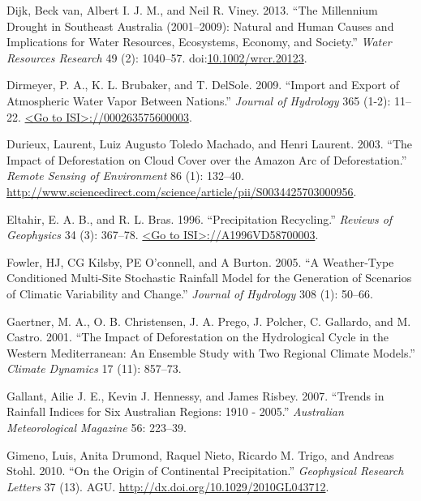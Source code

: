 \documentclass[fleqn,10pt,lineno]{wlpeerj} %
\begin{document}
\hypertarget{ref-vanDijk2013}{}
Dijk, Beck van, Albert I. J. M., and Neil R. Viney. 2013. ``The
Millennium Drought in Southeast Australia (2001--2009): Natural and
Human Causes and Implications for Water Resources, Ecosystems, Economy,
and Society.'' \emph{Water Resources Research} 49 (2): 1040--57.
doi:\href{https://doi.org/10.1002/wrcr.20123}{10.1002/wrcr.20123}.

\hypertarget{ref-Dirmeyer2009}{}
Dirmeyer, P. A., K. L. Brubaker, and T. DelSole. 2009. ``Import and
Export of Atmospheric Water Vapor Between Nations.'' \emph{Journal of
Hydrology} 365 (1-2): 11--22.
\href{\%3CGo\%20to\%20ISI\%3E://000263575600003}{\textless{}Go to ISI\textgreater{}://000263575600003}.

\hypertarget{ref-Durieux2003}{}
Durieux, Laurent, Luiz Augusto Toledo Machado, and Henri Laurent. 2003.
``The Impact of Deforestation on Cloud Cover over the Amazon Arc of
Deforestation.'' \emph{Remote Sensing of Environment} 86 (1): 132--40.
\url{http://www.sciencedirect.com/science/article/pii/S0034425703000956}.

\hypertarget{ref-Eltahir1996}{}
Eltahir, E. A. B., and R. L. Bras. 1996. ``Precipitation Recycling.''
\emph{Reviews of Geophysics} 34 (3): 367--78.
\href{\%3CGo\%20to\%20ISI\%3E://A1996VD58700003}{\textless{}Go to ISI\textgreater{}://A1996VD58700003}.

\hypertarget{ref-Fowler2005}{}
Fowler, HJ, CG Kilsby, PE O'connell, and A Burton. 2005. ``A
Weather-Type Conditioned Multi-Site Stochastic Rainfall Model for the
Generation of Scenarios of Climatic Variability and Change.''
\emph{Journal of Hydrology} 308 (1): 50--66.

\hypertarget{ref-Gaertner2001}{}
Gaertner, M. A., O. B. Christensen, J. A. Prego, J. Polcher, C.
Gallardo, and M. Castro. 2001. ``The Impact of Deforestation on the
Hydrological Cycle in the Western Mediterranean: An Ensemble Study with
Two Regional Climate Models.'' \emph{Climate Dynamics} 17 (11): 857--73.

\hypertarget{ref-Gallant2007}{}
Gallant, Ailie J. E., Kevin J. Hennessy, and James Risbey. 2007.
``Trends in Rainfall Indices for Six Australian Regions: 1910 - 2005.''
\emph{Australian Meteorological Magazine} 56: 223--39.

\hypertarget{ref-Gimeno2010}{}
Gimeno, Luis, Anita Drumond, Raquel Nieto, Ricardo M. Trigo, and Andreas
Stohl. 2010. ``On the Origin of Continental Precipitation.''
\emph{Geophysical Research Letters} 37 (13). AGU.
\url{http://dx.doi.org/10.1029/2010GL043712}.
\end{document}

